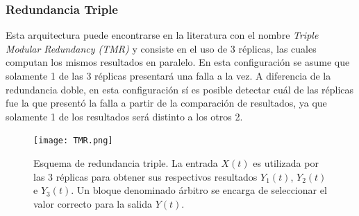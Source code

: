 

\subsubsection{Redundancia Triple}

Esta arquitectura puede encontrarse en la literatura con el nombre \textit{Triple Modular Redundancy (TMR)} \cite{lyons1962use} y consiste en el uso de 3 réplicas, las cuales computan los mismos resultados en paralelo. En esta configuración se asume que solamente 1 de las 3 réplicas presentará una falla a la vez. A diferencia de la redundancia doble, en esta configuración sí es posible detectar cuál de las réplicas fue la que presentó la falla a partir de la comparación de resultados, ya que solamente 1 de los resultados será distinto a los otros 2.

\begin{figure}[H]
    \centering
    \texttt{[image: TMR.png]}
    \caption{Esquema de redundancia triple. La entrada $X(t)$ es utilizada por las 3 réplicas para obtener sus respectivos resultados $Y_1(t)$, $Y_2(t)$ e $Y_3(t)$. Un bloque denominado árbitro se encarga de seleccionar el valor correcto para la salida $Y(t)$.}
    \label{fig:TMR}
\end{figure}

